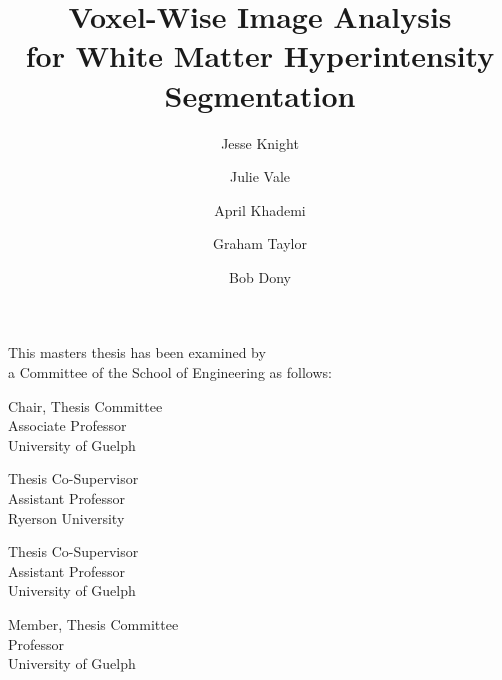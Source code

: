 \title{Voxel-Wise Image Analysis\\for White Matter Hyperintensity Segmentation}
\author{Jesse Knight}
\degreemonth{}
\copyrightnoticetext{}
\maketitle
\cleardoublepage{}
\setcounter{page}{1}
\begin{abstractpage}

\end{abstractpage}
\cleardoublepage{}
\begin{titlepage}
  \begin{large}
    This masters thesis has been examined by \\ a Committee of the School of Engineering as follows:
    \signature{Julie Vale}{Chair, Thesis Committee \\
      Associate Professor\\
      University of Guelph}
    \signature{April Khademi}{Thesis Co-Supervisor \\
      Assistant Professor\\
      Ryerson University}
    \signature{Graham Taylor}{Thesis Co-Supervisor \\
      Assistant Professor\\
      University of Guelph}
    \signature{Bob Dony}{Member, Thesis Committee \\
      Professor\\
      University of Guelph}
  \end{large}
\end{titlepage}
